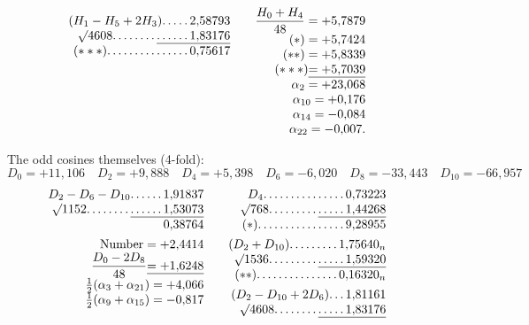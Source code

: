 \begin{landscape}
\[\begin{array}{@{}r@{\qquad}r@{\qquad}r@{}}
\begin{array}[t]{@{}r@{}}
(H_1-H_5+2H_3)\VfourDots{4}2{,}58793\\
\BareRoot{4608}\VfourDots{7}\underline{\VfourDots{5}1{,}83176}\\
(***)\VfourDots{14}0{,}75617
\end{array}
&\begin{array}[t]{@{}r@{}}
\dfrac{H_0+H_4}{48}=+5{,}7879\\
(*)=+5{,}7424\\
(**)=+5{,}8339\\
(***)\underline{=+5{,}7039}\\
\alpha_2=+23{,}068\\
\alpha_{10}=+0{,}176\\
\alpha_{14}=-0{,}084\\
\alpha_{22}=-0{,}007.
\end{array}
\end{array}
\]
\par\noindent\hspace*{\parindent}The odd cosines themselves (4-fold):
\[D_0=+11{,}106\quad D_2=+9{,}888\quad D_4=+5{,}398\quad D_6=-6{,}020\quad D_8=-33{,}443\quad D_{10}=-66{,}957\]
\clearpage{}
\[
\begin{array}{@{}r@{\qquad}r@{\qquad}r@{}}
\begin{array}[t]{@{}r@{}}
D_2-D_6-D_{10}\VfourDots{5}1{,}91837\\
\BareRoot{1152}\VfourDots{7}\underline{\VfourDots{5}1{,}53073}\\
0{,}38764\\[4pt]
\text{Number}=+2{,}4414\\
\dfrac{D_0-2D_8}{48}\underline{=+1{,}6248}\\
\tfrac12(\alpha_3+\alpha_{21})=+4{,}066\\
\tfrac12(\alpha_9+\alpha_{15})=-0{,}817
\end{array}
&\begin{array}[t]{@{}r@{}}
D_4\VfourDots{14}0{,}73223\\
\BareRoot{768}\VfourDots{8}\underline{\VfourDots{4}1{,}44268}\\
(*)\VfourDots{15}9{,}28955\\[4pt]
(D_2+D_{10})\VfourDots{8}1{,}75640_n\\
\BareRoot{1536}\VfourDots{8}\underline{\VfourDots{4}1{,}59320}\\
(**)\VfourDots{14}0{,}16320_n\\[4pt]
(D_2-D_{10}+2D_6)\VfourDots{2}1{,}81161\\
\BareRoot{4608}\VfourDots{7}\underline{\VfourDots{4}1{,}83176}\\

\end{array}
\end{array}\]
\end{landscape}
